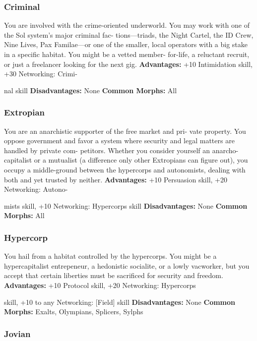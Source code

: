 \subsubsection{Criminal}

You are involved with the crime-oriented underworld. You 
may work with one of the Sol system's major criminal fac-
tions—triads, the Night Cartel, the ID Crew, Nine Lives, Pax 
Familae—or one of the smaller, local operators with a big 
stake in a specific habitat. You might be a vetted member-
for-life, a reluctant recruit, or just a freelancer looking for 
the next gig.
\textbf{Advantages:} +10 Intimidation skill, +30 Networking: Crimi-

nal skill
\textbf{Disadvantages:} None
\textbf{Common Morphs:} All

\subsubsection{Extropian}

You are an anarchistic supporter of the free market and pri-
vate property. You oppose government and favor a system 
where security and legal matters are handled by private com-
petitors. Whether you consider yourself an anarcho-capitalist 
or a mutualist (a difference only other Extropians can figure 
out), you occupy a middle-ground between the hypercorps 
and autonomists, dealing with both and yet trusted by neither.
\textbf{Advantages:} +10 Persuasion skill, +20 Networking: Autono-

mists skill, +10 Networking: Hypercorps skill
\textbf{Disadvantages:} None
\textbf{Common Morphs:} All

\subsubsection{Hypercorp}

You hail from a habitat controlled by the hypercorps. You 
might be a hypercapitalist entrepeneur, a hedonistic socialite, 
or a lowly vacworker, but you accept that certain liberties 
must be sacrificed for security and freedom.
\textbf{Advantages:} +10 Protocol skill, +20 Networking: Hypercorps 

skill, +10 to any Networking: [Field] skill
\textbf{Disadvantages:} None
\textbf{Common Morphs:} Exalts, Olympians, Splicers, Sylphs

\subsubsection{Jovian}

